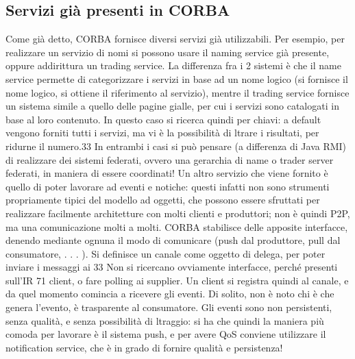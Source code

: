 \subsection{Servizi già presenti in CORBA}
Come già detto, CORBA fornisce diversi servizi già utilizzabili.
Per esempio, per realizzare un servizio di nomi si possono usare il naming
service già presente, oppure addirittura un trading service. La differenza fra
i 2 sistemi è che il name service permette di categorizzare i servizi in base ad
un nome logico (si fornisce il nome logico, si ottiene il riferimento al servizio),
mentre il trading service fornisce un sistema simile a quello delle pagine gialle,
per cui i servizi sono catalogati in base al loro contenuto. In questo caso si
ricerca quindi per chiavi: a default vengono forniti tutti i servizi, ma vi è la
possibilità di ltrare i risultati, per ridurne il numero.33
In entrambi i casi si può pensare (a differenza di Java RMI) di realizzare
dei sistemi federati, ovvero una gerarchia di name o trader server federati, in
maniera di essere coordinati!
Un altro servizio che viene fornito è quello di poter lavorare ad eventi e
notiche: questi infatti non sono strumenti propriamente tipici del modello ad
oggetti, che possono essere sfruttati per realizzare facilmente architetture con
molti clienti e produttori; non è quindi P2P, ma una comunicazione molti a
molti.
CORBA stabilisce delle apposite interfacce, denendo mediante ognuna il
modo di comunicare (push dal produttore, pull dal consumatore, . . . ). Si
definisce un canale come oggetto di delega, per poter inviare i messaggi ai
33 Non
si ricercano ovviamente interfacce, perché presenti sull'IR
71
client, o fare polling ai supplier. Un client si registra quindi al canale, e da
quel momento comincia a ricevere gli eventi.
Di solito, non è noto chi è che genera l'evento, è trasparente al consumatore.
Gli eventi sono non persistenti, senza qualità, e senza possibilità di ltraggio: si
ha che quindi la maniera più comoda per lavorare è il sistema push, e per avere
QoS conviene utilizzare il notification service, che è in grado di fornire qualità
e persistenza!